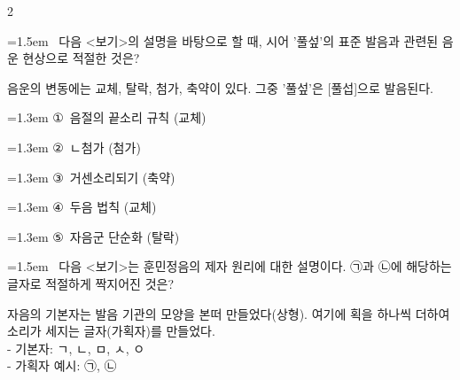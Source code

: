 \documentclass[10pt, a4paper]{article}
\begin{document}
\begin{multicols}{2}
\begin{minipage}{\columnwidth}
\vspace{4mm}
\end{minipage}
\par

\noindent\begin{minipage}{\columnwidth}
\vspace{2mm}
{\hangindent=1.5em  ~다음 <보기>의 설명을 바탕으로 할 때, 시어 '풀섶'의 표준 발음과 관련된 음운 현상으로 적절한 것은?\par}

\vspace{1mm}
\begin{boxibox}
음운의 변동에는 교체, 탈락, 첨가, 축약이 있다. 그중 '풀섶'은 [풀섭]으로 발음된다. \\
\end{boxibox}
\vspace{1mm}

\vspace{0.5mm}
{\hangindent=1.3em  \noindent\hspace{0.3em}①~음절의 끝소리 규칙 (교체)\par}
{\hangindent=1.3em  \noindent\hspace{0.3em}②~ㄴ첨가 (첨가)\par}
{\hangindent=1.3em  \noindent\hspace{0.3em}③~거센소리되기 (축약)\par}
{\hangindent=1.3em  \noindent\hspace{0.3em}④~두음 법칙 (교체)\par}
{\hangindent=1.3em  \noindent\hspace{0.3em}⑤~자음군 단순화 (탈락)\par}
\vspace{4mm}
\end{minipage}
\par

\noindent\begin{minipage}{\columnwidth}
\vspace{2mm}
{\hangindent=1.5em  ~다음 <보기>는 훈민정음의 제자 원리에 대한 설명이다. ㉠과 ㉡에 해당하는 글자로 적절하게 짝지어진 것은?\par}

\vspace{1mm}
\begin{boxibox}
자음의 기본자는 발음 기관의 모양을 본떠 만들었다(상형). 여기에 획을 하나씩 더하여 소리가 세지는 글자(가획자)를 만들었다. \\
- 기본자: ㄱ, ㄴ, ㅁ, ㅅ, ㅇ \\
- 가획자 예시: ㉠, ㉡ \\
\end{boxibox}
\vspace{1mm}


\end{minipage}
\end{multicols}
\end{document}

